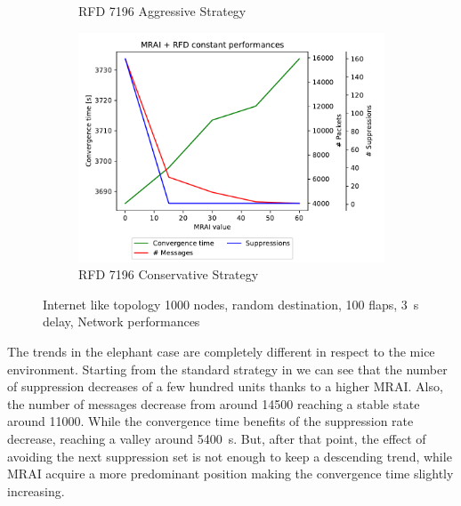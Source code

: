 \begin{figure}[h]
\begin{subfigure}[b]{0.325\textwidth}
         \caption{RFD 7196 Aggressive Strategy}
         \label{fig:1000_7196RFDA_multiMRAI_elephants}
     \end{subfigure}
     \hfill
     \begin{subfigure}[b]{0.325\textwidth}
         \centering
         \includegraphics[width=\textwidth]{images/RFD/miceVSelephants/MultiMRAI/elephants/cisco_1000_RFD_7196_conservative-constant_mrai_rfd_evolution.pdf}
         \caption{RFD 7196 Conservative Strategy}
         \label{fig:1000_7196RFDC_multiMRAI_elephants}
     \end{subfigure}
		\caption{Internet like topology \num{1000} nodes, random destination, \num{100} flaps, \SI{3}{\second} delay, Network performances}
        \label{fig:1000_RFD_multiMRAI_elephants}
\end{figure}

The trends in the elephant case are completely different in respect to the
mice environment.
Starting from the standard strategy in 
we can see that the number of suppression decreases of a few hundred units
thanks to a higher \ac{MRAI}.
Also, the number of messages decrease from around \num{14500} reaching a stable
state around \num{11000}.
While the convergence time benefits of the suppression rate decrease, reaching
a valley around \SI{5400}{\second}.
But, after that point, the effect of avoiding the next suppression set is not enough to keep
a descending trend, while \ac{MRAI} acquire a more predominant position making
the convergence time slightly increasing.

